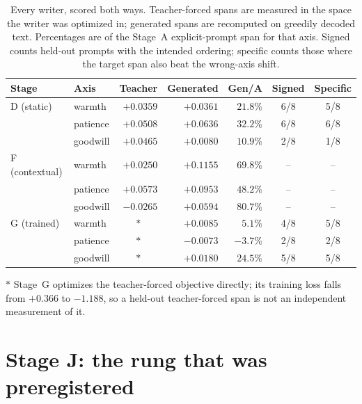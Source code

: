 \documentclass[10pt]{article}
\begin{document}
\begin{table}[t]
\centering
\caption{Every writer, scored both ways. Teacher-forced spans are measured in
the space the writer was optimized in; generated spans are recomputed on greedily
decoded text. Percentages are of the Stage~A explicit-prompt span for that axis.
Signed counts held-out prompts with the intended ordering; specific counts those
where the target span also beat the wrong-axis shift.}
\label{tab:main}
\begin{tabular}{llrrrcc}
\toprule
Stage & Axis & Teacher & Generated & Gen/A & Signed & Specific \\
\midrule
D (static)     & warmth   & $+0.0359$ & $+0.0361$ & $21.8\%$ & 6/8 & 5/8 \\
               & patience & $+0.0508$ & $+0.0636$ & $32.2\%$ & 6/8 & 6/8 \\
               & goodwill & $+0.0465$ & $+0.0080$ & $10.9\%$ & 2/8 & 1/8 \\
\addlinespace
F (contextual) & warmth   & $+0.0250$ & $+0.1155$ & $69.8\%$ & -- & -- \\
               & patience & $+0.0573$ & $+0.0953$ & $48.2\%$ & -- & -- \\
               & goodwill & $-0.0265$ & $+0.0594$ & $80.7\%$ & -- & -- \\
\addlinespace
G (trained)    & warmth   & \multicolumn{1}{c}{$\ast$} & $+0.0085$ & $5.1\%$  & 4/8 & 5/8 \\
               & patience & \multicolumn{1}{c}{$\ast$} & $-0.0073$ & $-3.7\%$ & 2/8 & 2/8 \\
               & goodwill & \multicolumn{1}{c}{$\ast$} & $+0.0180$ & $24.5\%$ & 5/8 & 5/8 \\
\bottomrule
\end{tabular}

\vspace{2pt}
{\footnotesize $\ast$ Stage~G optimizes the teacher-forced objective directly;
its training loss falls from $+0.366$ to $-1.188$, so a held-out teacher-forced
span is not an independent measurement of it.}
\end{table}

\section{Stage J: the rung that was preregistered}
\label{sec:stagej}
\end{document}
